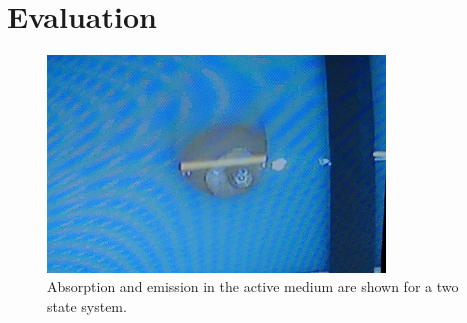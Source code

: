 \newpage
\section{Evaluation}
\label{sec:evaluation}

\begin{figure}
    \center
    \includegraphics[width=0.8\textwidth]{bilder/fluorescence.jpg}
    \caption{Absorption and emission in the active medium are shown for a two state system. \cite{anleitungHeNe}}
    \label{fig:fluorescence}
\end{figure}


